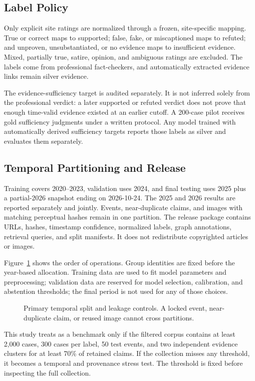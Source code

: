 \subsection{Label Policy}

Only explicit site ratings are normalized through a frozen, site-specific mapping. True or correct maps to supported; false, fake, or miscaptioned maps to refuted; and unproven, unsubstantiated, or no evidence maps to insufficient evidence. Mixed, partially true, satire, opinion, and ambiguous ratings are excluded. The labels come from professional fact-checkers, and automatically extracted evidence links remain silver evidence.

The evidence-sufficiency target is audited separately. It is not inferred solely from the professional verdict: a later supported or refuted verdict does not prove that enough time-valid evidence existed at an earlier cutoff. A 200-case pilot receives gold sufficiency judgments under a written protocol. Any model trained with automatically derived sufficiency targets reports those labels as silver and evaluates them separately.

\subsection{Temporal Partitioning and Release}

Training covers 2020--2023, validation uses 2024, and final testing uses 2025 plus a partial-2026 snapshot ending on 2026-10-24. The 2025 and 2026 results are reported separately and jointly. Events, near-duplicate claims, and images with matching perceptual hashes remain in one partition. The release package contains URLs, hashes, timestamp confidence, normalized labels, graph annotations, retrieval queries, and split manifests. It does not redistribute copyrighted articles or images.

Figure~\ref{fig:temporal-protocol} shows the order of operations. Group identities are fixed before the year-based allocation. Training data are used to fit model parameters and preprocessing; validation data are reserved for model selection, calibration, and abstention thresholds; the final period is not used for any of those choices.

\begin{figure}[t]
\centering
\resizebox{\columnwidth}{!}{}
\caption{Primary temporal split and leakage controls. A locked event, near-duplicate claim, or reused image cannot cross partitions.}
\label{fig:temporal-protocol}
\end{figure}

This study treats \datasetname{} as a benchmark only if the filtered corpus contains at least 2,000 cases, 300 cases per label, 50 test events, and two independent evidence clusters for at least 70\% of retained claims. If the collection misses any threshold, it becomes a temporal and provenance stress test. The threshold is fixed before inspecting the full collection.


